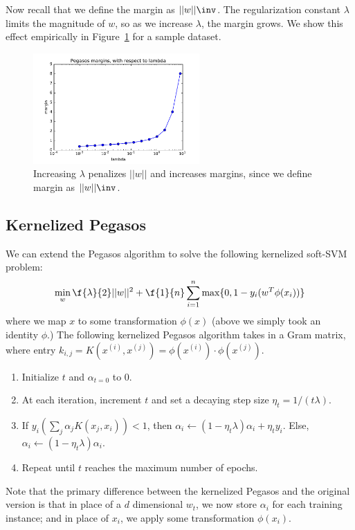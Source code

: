\documentclass{article}
\begin{document}
\begin{multicols}{2}
Now recall that we define the margin as $||w||\inv$.
The regularization constant $\lambda$ limits the magnitude of $w$,
so as we increase $\lambda$, the margin grows.
We show this effect empirically in Figure~\ref{fig:3-2-margins} for a sample dataset.

\begin{figure}[t]
   \centering
	\includegraphics[width=2.5in]{img/3-2-margins.pdf}
   \caption{Increasing $\lambda$ penalizes $||w||$ and increases margins, since we define margin as $||w||\inv$.}
   \label{fig:3-2-margins}
\end{figure}

\subsection{Kernelized Pegasos}
\label{subsec:kernel-peg}

We can extend the Pegasos algorithm
to solve the following kernelized soft-SVM problem:
\begin{equation}
   \min_w{\f{\lambda}{2}||w||^2} + \f{1}{n}\sum_{i=1}^n{\max\{0,1-y_i(w^T\phi(x_i))\}}
\end{equation}
where we map $x$ to some transformation $\phi(x)$ (above we simply took an identity $\phi$.)
The following kernelized Pegasos algorithm takes in a Gram matrix, 
where entry $k_{i,j} = K(x^{(i)},x^{(j)}) = \phi(x^{(i)})\cdot\phi(x^{(j)})$.
\begin{enumerate}
\item Initialize $t$ and $\alpha_{t=0}$ to 0.
\item At each iteration, increment $t$ and set a decaying step size $\eta_t = 1/(t\lambda)$.
\item If $y_i(\sum_j{\alpha_jK(x_j,x_i)})<1$, then $\alpha_{i}\leftarrow(1-\eta_t\lambda)\alpha_i+\eta_ty_i$. Else,  $\alpha_{i}\leftarrow(1-\eta_t\lambda)\alpha_i$.
\item Repeat until $t$ reaches the maximum number of epochs.
\end{enumerate}
Note that the primary difference between the kernelized Pegasos and the original version is that in place of a $d$ dimensional $w_t$, we now store $\alpha_i$ for each training instance; and in place of $x_i$, we apply some transformation $\phi(x_i)$.


\end{multicols}
\end{document}
